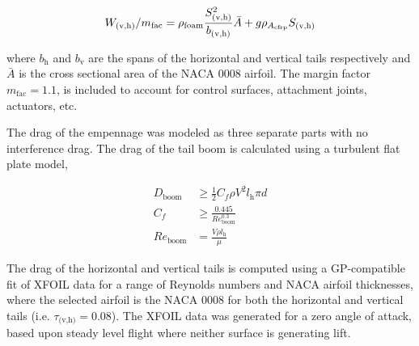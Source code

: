 \begin{equation}
    W_{\text{(v,h)}}/m_{\text{fac}} = \rho_{\text{foam}} \frac{S_{\text{(v,h)}}^2}{b_{\text{(v,h)}}} \bar{A} + g\rho_{A_{\text{cfrp}}} S_{\text{(v,h)}} \\
\end{equation}

where $b_{\text{h}}$ and $b_{\text{v}}$ are the spans of the horizontal and vertical tails respectively and $\bar{A}$ is the cross sectional area of the NACA 0008 airfoil. The margin factor $m_{\text{fac}}=1.1$, is included to account for control surfaces, attachment joints, actuators, etc. 

The drag of the empennage was modeled as three separate parts with no interference drag.  The drag of the tail boom is calculated using a turbulent flat plate model,

\begin{align}
    \label{e:boomdrag}
    D_{\text{boom}} &\geq \frac{1}{2} C_f \rho V^2 l_{\text{h}}\pi d \\
    C_f &\geq \frac{0.445}{Re_{\text{boom}}^{0.3}} \\
    Re_{\text{boom}} &= \frac{V\rho l_{\text{h}}}{\mu}
\end{align}

The drag of the horizontal and vertical tails is computed using a GP-compatible fit of XFOIL data for a range of Reynolds numbers and NACA airfoil thicknesses,
where the selected airfoil is the NACA 0008 for both the horizontal and vertical tails (i.e. $\tau_{\text{(v,h)}} = 0.08$). 
The XFOIL data was generated for a zero angle of attack, based upon steady level flight where neither surface is generating lift.  


